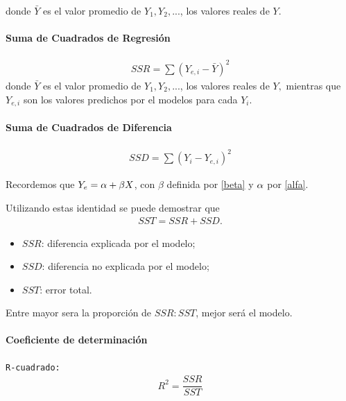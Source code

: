 donde $\bar{Y}$ es el valor promedio de $Y_{1}, Y_{2},...$, los valores reales de $Y.$


\paragraph{Suma de Cuadrados de Regresión}

\begin{align}
 SSR = \sum\left( Y_{e,i}-\bar{Y} \right)^{2}
\end{align}
donde $\bar{Y}$ es el valor promedio de $Y_{1}, Y_{2},...$, los valores reales de $Y,$ mientras que $Y_{e,i}$ son los valores predichos por el modelos para cada $Y_{i}.$


\paragraph{Suma de Cuadrados de Diferencia}
\begin{align}
 SSD = \sum\left( Y_{i}-Y_{e,i} \right)^{2}
\end{align}



Recordemos que $Y_{e}=\alpha + \beta X$, con $\beta$ definida por \eqref{beta} y $\alpha$ por \eqref{alfa}.



Utilizando estas identidad se puede demostrar que
\begin{align}
 SST = SSR +SSD.
\end{align}



\begin{itemize}
 \item $SSR$: diferencia explicada por el modelo;
 \item $SSD$: diferencia no explicada por el modelo;
 \item $SST$: error total.
\end{itemize}




\begin{rem}
 Entre mayor sera la proporción de $SSR:SST$, mejor será el modelo.
\end{rem}


\paragraph{Coeficiente de determinación}
\texttt{R-cuadrado: }
\begin{align}
 R^{2}=\dfrac{SSR}{SST}
\end{align}



